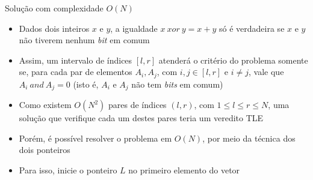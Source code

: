 \begin{frame}[fragile]{Solução com complexidade $O(N)$}

    \begin{itemize}
        \item Dados dois inteiros $x$ e $y$, a igualdade $x\ xor\ y = x + y$ só é verdadeira
            se $x$ e $y$ não tiverem nenhum \textit{bit} em comum

        \item Assim, um intervalo de índices $[l, r]$ atenderá o critério do problema somente se,
            para cada par de elementos $A_i, A_j$, com $i, j\in [l, r]$ e $i \neq j$, vale que
            $A_i\ and\ A_j = 0$ (isto é, $A_i$ e $A_j$ não tem \textit{bits} em comum)

        \item Como existem $O(N^2)$ pares de índices $(l, r)$, com $1\leq l\leq r\leq N$, uma
            solução que verifique cada um destes pares teria um veredito TLE

        \item Porém, é possível resolver o problema em $O(N)$, por meio da técnica dos dois
            ponteiros

        \item Para isso, inicie o ponteiro $L$ no primeiro elemento do vetor
   \end{itemize}

\end{frame}

